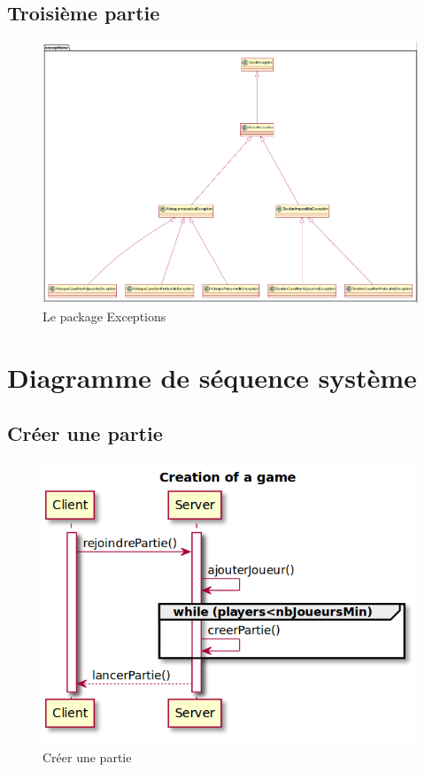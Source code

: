 \subsection{Troisième partie}
	\vspace{10mm}
	\begin{figure}[!h]
		\centering
		\includegraphics[scale=0.4]{images/DP3.png}
		\caption{Le package Exceptions}
	\end{figure}

\newpage
\section{Diagramme de séquence système}
\subsection{Créer une partie}
	\vspace{10mm}
	\begin{figure}[!h]
		\centering
		\includegraphics[scale=0.5]{images/DSSCreate.png}
		\caption{Créer une partie}
	\end{figure}


